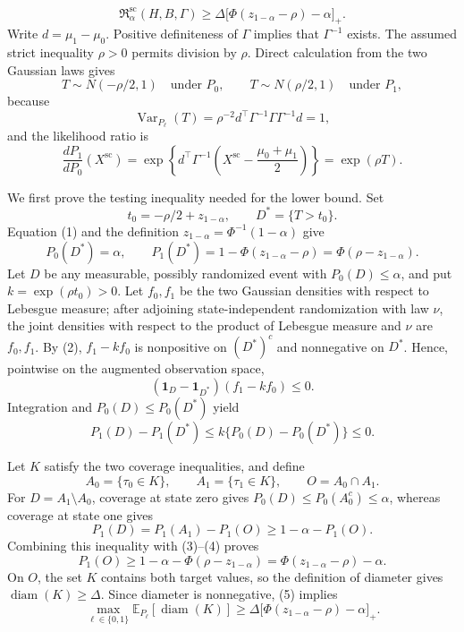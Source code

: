 \[
 \mathfrak R_{\alpha}^{\mathrm{sc}}(H,B,\Gamma)
 \geq
 \Delta\bigl[\Phi(z_{1-\alpha}-\rho)-\alpha\bigr]_+.
\]
Write \(d=\mu_1-\mu_0\). Positive definiteness of \(\Gamma\) implies that \(\Gamma^{-1}\) exists. The assumed strict inequality \(\rho>0\) permits division by \(\rho\). Direct calculation from the two Gaussian laws gives
\[
 T\sim N(-\rho/2,1)\quad\text{under }P_0,
 \qquad
 T\sim N(\rho/2,1)\quad\text{under }P_1,
 \tag{1}
\]
because
\[
 \operatorname{Var}_{P_\ell}(T)
 =\rho^{-2}d^{\top}\Gamma^{-1}\Gamma\Gamma^{-1}d=1,
\]
and the likelihood ratio is
\[
 \frac{dP_1}{dP_0}(X^{\mathrm{sc}})
 =\exp\!\left\{d^{\top}\Gamma^{-1}
 \left(X^{\mathrm{sc}}-\frac{\mu_0+\mu_1}{2}\right)\right\}
 =\exp(\rho T).
 \tag{2}
\]

We first prove the testing inequality needed for the lower bound. Set
\[
 t_0=-\rho/2+z_{1-\alpha},
 \qquad
 D^*=\{T>t_0\}.
\]
Equation (1) and the definition \(z_{1-\alpha}=\Phi^{-1}(1-\alpha)\) give
\[
 P_0(D^*)=\alpha,
 \qquad
 P_1(D^*)=1-\Phi(z_{1-\alpha}-\rho)
 =\Phi(\rho-z_{1-\alpha}).
 \tag{3}
\]
Let \(D\) be any measurable, possibly randomized event with \(P_0(D)\leq\alpha\), and put \(k=\exp(\rho t_0)>0\). Let \(f_0,f_1\) be the two Gaussian densities with respect to Lebesgue measure; after adjoining state-independent randomization with law \(\nu\), the joint densities with respect to the product of Lebesgue measure and \(\nu\) are \(f_0,f_1\). By (2), \(f_1-kf_0\) is nonpositive on \((D^*)^c\) and nonnegative on \(D^*\). Hence, pointwise on the augmented observation space,
\[
 (\mathbf 1_D-\mathbf 1_{D^*})(f_1-kf_0)\leq0.
\]
Integration and \(P_0(D)\leq P_0(D^*)\) yield
\[
 P_1(D)-P_1(D^*)
 \leq k\{P_0(D)-P_0(D^*)\}\leq0.
 \tag{4}
\]

Let \(K\) satisfy the two coverage inequalities, and define
\[
 A_0=\{\tau_0\in K\},
 \qquad
 A_1=\{\tau_1\in K\},
 \qquad
 O=A_0\cap A_1.
\]
For \(D=A_1\setminus A_0\), coverage at state zero gives \(P_0(D)\leq P_0(A_0^c)\leq\alpha\), whereas coverage at state one gives
\[
 P_1(D)=P_1(A_1)-P_1(O)\geq1-\alpha-P_1(O).
\]
Combining this inequality with (3)--(4) proves
\[
 P_1(O)
 \geq1-\alpha-\Phi(\rho-z_{1-\alpha})
 =\Phi(z_{1-\alpha}-\rho)-\alpha.
 \tag{5}
\]
On \(O\), the set \(K\) contains both target values, so the definition of diameter gives \(\operatorname{diam}(K)\geq\Delta\). Since diameter is nonnegative, (5) implies
\[
 \max_{\ell\in\{0,1\}}
 \mathbb E_{P_\ell}[\operatorname{diam}(K)]
 \geq
 \Delta\bigl[\Phi(z_{1-\alpha}-\rho)-\alpha\bigr]_+.
 \tag{6}
\]

